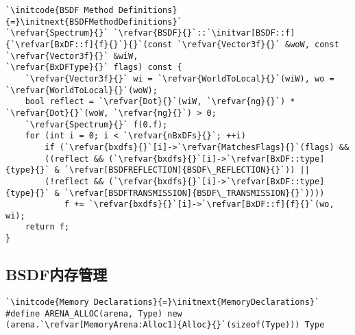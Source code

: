 \begin{lstlisting}
`\initcode{BSDF Method Definitions}{=}\initnext{BSDFMethodDefinitions}`
`\refvar{Spectrum}{}` `\refvar{BSDF}{}`::`\initvar[BSDF::f]{`\refvar[BxDF::f]{f}{}`}{}`(const `\refvar{Vector3f}{}` &woW, const `\refvar{Vector3f}{}` &wiW,
`\refvar{BxDFType}{}` flags) const {
    `\refvar{Vector3f}{}` wi = `\refvar{WorldToLocal}{}`(wiW), wo = `\refvar{WorldToLocal}{}`(woW);
    bool reflect = `\refvar{Dot}{}`(wiW, `\refvar{ng}{}`) * `\refvar{Dot}{}`(woW, `\refvar{ng}{}`) > 0;
    `\refvar{Spectrum}{}` f(0.f);
    for (int i = 0; i < `\refvar{nBxDFs}{}`; ++i)
        if (`\refvar{bxdfs}{}`[i]->`\refvar{MatchesFlags}{}`(flags) &&
        ((reflect && (`\refvar{bxdfs}{}`[i]->`\refvar[BxDF::type]{type}{}` & `\refvar[BSDFREFLECTION]{BSDF\_REFLECTION}{}`)) ||
        (!reflect && (`\refvar{bxdfs}{}`[i]->`\refvar[BxDF::type]{type}{}` & `\refvar[BSDFTRANSMISSION]{BSDF\_TRANSMISSION}{}`))))
            f += `\refvar{bxdfs}{}`[i]->`\refvar[BxDF::f]{f}{}`(wo, wi);
    return f;
}
\end{lstlisting}

\subsection{BSDF内存管理}\label{sub:BSDF内存管理}
\begin{lstlisting}
`\initcode{Memory Declarations}{=}\initnext{MemoryDeclarations}`
#define ARENA_ALLOC(arena, Type) new (arena.`\refvar[MemoryArena:Alloc1]{Alloc}{}`(sizeof(Type))) Type
\end{lstlisting}